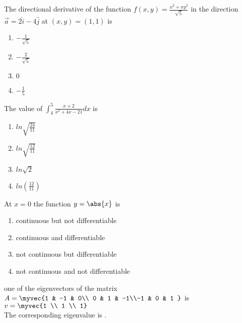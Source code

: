 \iffalse
\chapter{2013}
\author{AI24BTECH11026}
\section{ae}
\fi
\item The directional derivative of the function $f(x,y)=\frac{x^2+xy^2}{\sqrt{5}}$ in the direction $\overrightarrow{a}=2 \hat{i}-4 \hat{j}$ at $(x,y)=(1,1)$ is 
\begin{enumerate}
    \item $-\frac{1}{\sqrt{5}}$
    \item $-\frac{2}{\sqrt{5}}$
    \item $0$
    \item $-\frac{1}{5} $\\
\end{enumerate}

\item The value of $\int_4^5 \frac{x+2}{x^2+4x-21} dx$ is 
\begin{enumerate}
    \item $ln\sqrt{\frac{24}{11}}$
    \item $ln\sqrt{\frac{12}{11}}$
    \item $ln\sqrt{2}$
    \item $ln(\frac{12}{11})$\\
\end{enumerate}

\item At $x=0$ the function $y=\abs{x}$ is
\begin{enumerate}
    \item continuous but not differentiable
    \item continuous and differentiable
    \item not continuous but differentiable
    \item not continuous and not differentiable \\
\end{enumerate}

\item one of the eigenvectors of the matrix \\ $A=\myvec{1 & -1 & 0\\ 0 & 1 & -1\\-1 & 0 & 1 }$ is $v=  \myvec{1 \\ 1 \\ 1}$ \\ The corresponding eigenvalue is \underline{\hspace{1cm}}.\\ 

